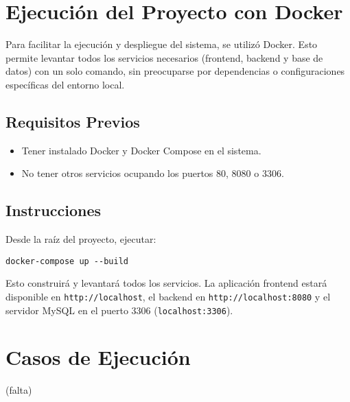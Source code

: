 \section{Ejecución del Proyecto con Docker}

Para facilitar la ejecución y despliegue del sistema, se utilizó Docker. Esto permite levantar todos los servicios necesarios (frontend, backend y base de datos) con un solo comando, sin preocuparse por dependencias o configuraciones específicas del entorno local.

\subsection{Requisitos Previos}

\begin{itemize}
    \item Tener instalado Docker y Docker Compose en el sistema.
    \item No tener otros servicios ocupando los puertos 80, 8080 o 3306.
\end{itemize}

\subsection{Instrucciones}

Desde la raíz del proyecto, ejecutar:

\begin{lstlisting}[style=terminal]
docker-compose up --build
\end{lstlisting}

Esto construirá y levantará todos los servicios. La aplicación frontend estará disponible en \texttt{http://localhost}, el backend en \texttt{http://localhost:8080} y el servidor MySQL en el puerto 3306 (\texttt{localhost:3306}).

\section{Casos de Ejecución}

(falta)
